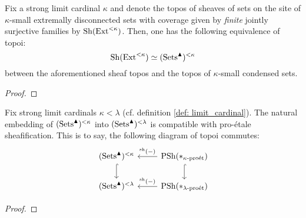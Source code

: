                 \begin{lemma} \label{lemma: small_condensed_sets_and_extremally_disconnected_sets}
                    Fix a strong limit cardinal $\kappa$ and denote the topos of sheaves of sets on the site of $\kappa$-small extremally disconnected sets with coverage given by \textit{finite} jointly surjective families by $\mathrm{Sh}(\mathrm{Ext}^{< \kappa})$. Then, one has the following equivalence of topoi:
                        $$\mathrm{Sh}(\mathrm{Ext}^{< \kappa}) \simeq (\mathrm{Sets}^{\blacktriangle})^{< \kappa}$$
                    between the aforementioned sheaf topos and the topos of $\kappa$-small condensed sets.
                \end{lemma}
                    \begin{proof}
                        
                    \end{proof}
                    
                \begin{lemma} \label{lemma: large_condensed_sets}
                    Fix strong limit cardinals $\kappa < \lambda$ (cf. definition \ref{def: limit_cardinal}). The natural embedding of $(\mathrm{Sets}^{\blacktriangle})^{< \kappa}$ into $(\mathrm{Sets}^{\blacktriangle})^{< \lambda}$ is compatible with pro-\'etale sheafification. This is to say, the following diagram of topoi commutes:
                        $$
                            \begin{tikzcd}
                            	{(\Sets^{\cond})^{< \kappa}} & {\Psh(*_{\kappa\-\proet})} \\
                            	{(\Sets^{\cond})^{< \lambda}} & {\Psh(*_{\lambda\-\proet})}
                            	\arrow[hook, from=1-1, to=2-1]
                            	\arrow[hook, from=1-2, to=2-2]
                            	\arrow["{{}^{\sh}(-)}"', from=1-2, to=1-1]
                            	\arrow["{{}^{\sh}(-)}"', from=2-2, to=2-1]
                            \end{tikzcd}
                        $$
                \end{lemma}
                    \begin{proof}
                        
                    \end{proof}
                
